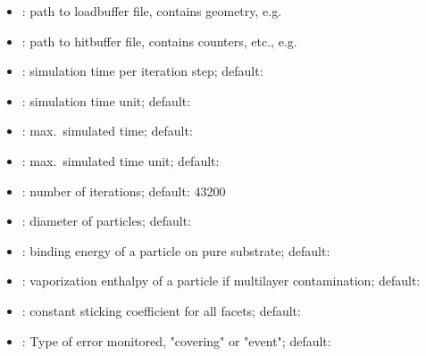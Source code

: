 \begin{itemize}[noitemsep,topsep=0pt, partopsep=0pt]
\item {}: path to loadbuffer file, contains geometry, e.g.\ 
\item {}: path to hitbuffer file, contains counters, etc., e.g.\ 
\item {}: simulation time per iteration step; default: 
\item {}: simulation time unit; default: 
\item {}: max.\ simulated time; default: 
\item {}: max.\ simulated time unit; default: 
\item {}: number of iterations; default: 43200
\item {}: diameter of particles; default:
\item {}: binding energy of a particle on pure substrate; default:
\item {}: vaporization enthalpy of a particle if multilayer contamination; default:
\item {}: constant sticking coefficient for all facets; default:
\item {}: Type of error monitored, "covering" or "event"; default: 

\end{itemize}
